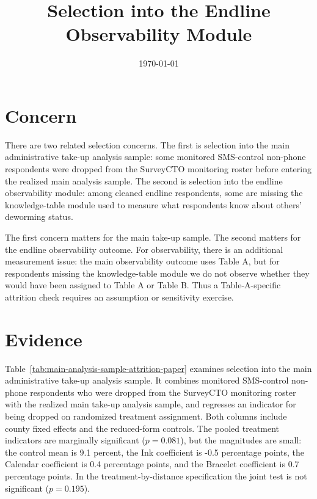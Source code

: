 \documentclass[11pt]{article}
\title{Selection into the Endline Observability Module}
\date{\today}
\begin{document}
\maketitle

\section*{Concern}

There are two related selection concerns. The first is selection into the main administrative take-up analysis sample: some monitored SMS-control non-phone respondents were dropped from the SurveyCTO monitoring roster before entering the realized main analysis sample. The second is selection into the endline observability module: among cleaned endline respondents, some are missing the knowledge-table module used to measure what respondents know about others' deworming status.

The first concern matters for the main take-up sample. The second matters for the endline observability outcome. For observability, there is an additional measurement issue: the main observability outcome uses Table A, but for respondents missing the knowledge-table module we do not observe whether they would have been assigned to Table A or Table B. Thus a Table-A-specific attrition check requires an assumption or sensitivity exercise.

\section*{Evidence}

Table~\ref{tab:main-analysis-sample-attrition-paper} examines selection into the main administrative take-up analysis sample. It combines monitored SMS-control non-phone respondents who were dropped from the SurveyCTO monitoring roster with the realized main take-up analysis sample, and regresses an indicator for being dropped on randomized treatment assignment. Both columns include county fixed effects and the reduced-form controls. The pooled treatment indicators are marginally significant ($p=0.081$), but the magnitudes are small: the control mean is 9.1 percent, the Ink coefficient is -0.5 percentage points, the Calendar coefficient is 0.4 percentage points, and the Bracelet coefficient is 0.7 percentage points. In the treatment-by-distance specification the joint test is not significant ($p=0.195$).

\begin{table}[htbp]
\caption{Main Analysis Sample Attrition}
\label{tab:main-analysis-sample-attrition-paper}
\scriptsize

\end{table}
\end{document}
